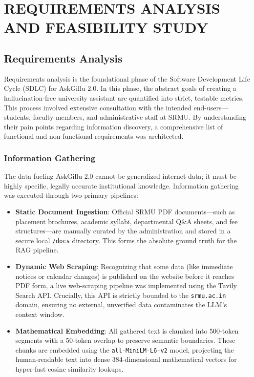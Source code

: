 \documentclass[12pt,a4paper]{report}
\begin{document}
\chapter{REQUIREMENTS ANALYSIS AND FEASIBILITY STUDY}

\section{Requirements Analysis}
Requirements analysis is the foundational phase of the Software Development Life Cycle (SDLC) for AskGillu 2.0. In this phase, the abstract goals of creating a hallucination-free university assistant are quantified into strict, testable metrics. This process involved extensive consultation with the intended end-users---students, faculty members, and administrative staff at SRMU. By understanding their pain points regarding information discovery, a comprehensive list of functional and non-functional requirements was architected.

\subsection{Information Gathering}
The data fueling AskGillu 2.0 cannot be generalized internet data; it must be highly specific, legally accurate institutional knowledge. Information gathering was executed through two primary pipelines:
\begin{itemize}
    \item \textbf{Static Document Ingestion}: Official SRMU PDF documents---such as placement brochures, academic syllabi, departmental Q\&A sheets, and fee structures---are manually curated by the administration and stored in a secure local \texttt{/docs} directory. This forms the absolute ground truth for the RAG pipeline.
    \item \textbf{Dynamic Web Scraping}: Recognizing that some data (like immediate notices or calendar changes) is published on the website before it reaches PDF form, a live web-scraping pipeline was implemented using the Tavily Search API. Crucially, this API is strictly bounded to the \texttt{srmu.ac.in} domain, ensuring no external, unverified data contaminates the LLM's context window.
    \item \textbf{Mathematical Embedding}: All gathered text is chunked into 500-token segments with a 50-token overlap to preserve semantic boundaries. These chunks are embedded using the \texttt{all-MiniLM-L6-v2} model, projecting the human-readable text into dense 384-dimensional mathematical vectors for hyper-fast cosine similarity lookups.
\end{itemize}
\end{document}
